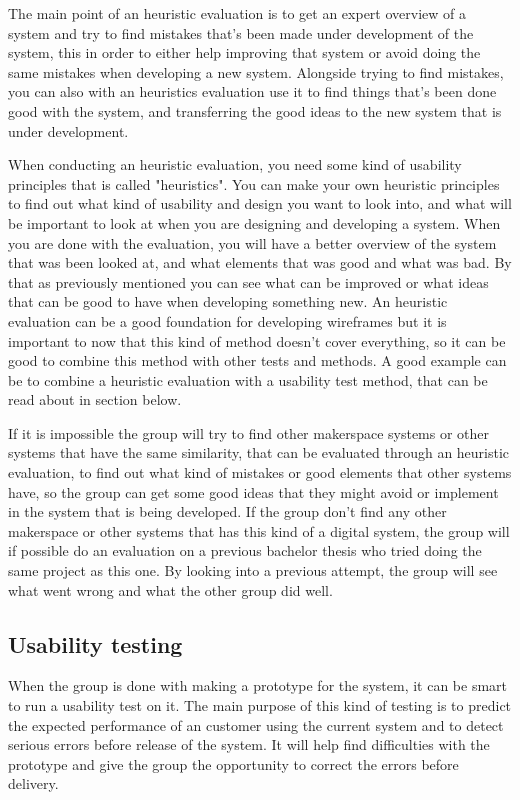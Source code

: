 The main point of an heuristic evaluation is to get an expert overview of a system and try to find mistakes that's been made 
under development of the system, this in order to either help improving that system or avoid doing the same mistakes when developing a new system. Alongside trying to find mistakes, you can also with an heuristics evaluation use it to find things that's been done good with the system, and transferring the good ideas to the new system that is under development. 

When conducting an heuristic evaluation, you need some kind of usability principles that is called "heuristics"\cite{heuristic-evaluation}. You can make your own heuristic principles to find out what kind of usability and design you want to look into, and what will be important to look at when you are designing and developing a system. When you are done with the evaluation, you will have a better overview of the system that was been looked at, and what elements that was good and what was bad. By that as previously mentioned you can see what can be improved or what ideas that can be good to have when developing something new. An heuristic evaluation can be a good foundation for developing wireframes but it is important to now that this kind of method doesn't cover everything, so it can be good to combine this method with other tests and methods.\cite{heuristic-evaluation} A good example can be to combine a heuristic evaluation with a usability test method, that can be read about in section below.

If it is impossible the group will try to find other makerspace systems or other systems that have the same similarity, that can be evaluated through an heuristic evaluation, to find out what kind of mistakes or good elements that other systems have, so the group can get some good ideas that they might avoid or implement in the system that is being developed. If the group don't find any other makerspace or other systems that has this kind of a digital system, the group will if possible do an evaluation on a previous bachelor thesis who tried doing the same project as this one. By looking into a previous attempt, the group will see what went wrong and what the other group did well.\cite{heuristic-evaluation}

\subsection{Usability testing}
When the group is done with making a prototype for the system, it can be 
smart to run a usability test on it. The main purpose of this kind of testing is to predict the expected performance of an customer using the current system and to detect serious errors before release of the system.\cite{usability-testing}%
It will help find difficulties with the prototype and give the group the opportunity to correct the errors before delivery.   

